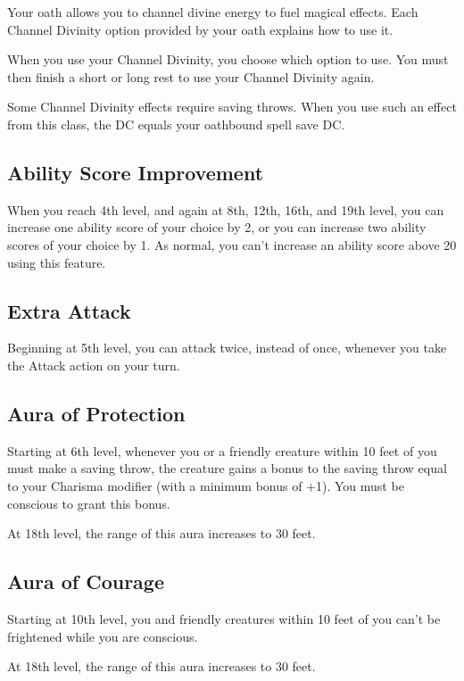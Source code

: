 Your oath allows you to channel divine energy to fuel magical effects. Each Channel Divinity option provided by your oath explains how to use it.

When you use your Channel Divinity, you choose which option to use. You must then finish a short or long rest to use your Channel Divinity again.

Some Channel Divinity effects require saving throws. When you use such an effect from this class, the DC equals your oathbound spell save DC.

\subsection{Ability Score Improvement}

When you reach 4th level, and again at 8th, 12th, 16th, and 19th level, you can increase one ability score of your choice by 2, or you can increase two ability scores of your choice by 1. As normal, you can’t increase an ability score above 20 using this feature.

\subsection{Extra Attack}

Beginning at 5th level, you can attack twice, instead of once, whenever you take the Attack action on your turn.

\subsection{Aura of Protection}

Starting at 6th level, whenever you or a friendly creature within 10 feet of you must make a saving throw, the creature gains a bonus to the saving throw equal to your Charisma modifier (with a minimum bonus of +1). You must be conscious to grant this bonus.

At 18th level, the range of this aura increases to 30 feet.

\subsection{Aura of Courage}

Starting at 10th level, you and friendly creatures within 10 feet of you can’t be frightened while you are conscious.

At 18th level, the range of this aura increases to 30 feet.

